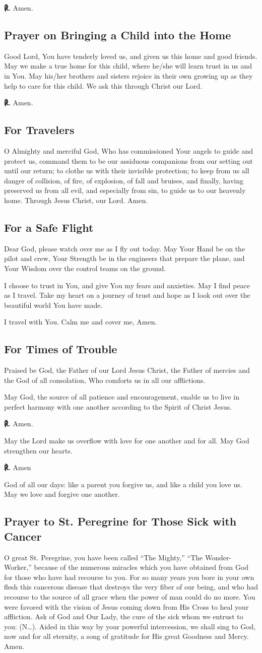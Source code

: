 \documentclass[12pt]{article}
\makeatletter
\newcommand{\prayertitle}[1]{\subsection{#1}}
\newcommand{\insertname}{(N\dots)\xspace}
\newcommand{\response}{{\setmainfont{Times New Roman}\textbf{℟.}}\xspace}
\DeclareRobustCommand{\response}{\textbf{\vers@resp{0pt}{R}.}\xspace}
\newcommand{\vers@resp@sym}{\raisebox{0.2ex}{\rotatebox[origin=c]{-20}{$\m@th\rceil$}}}
\newcommand{\vers@resp}[2]{%
		{\ooalign{\hidewidth\kern#1\vers@resp@sym\hidewidth\cr#2\cr}}%
	}
\makeatother
\begin{document}
\response Amen.

\prayertitle{Prayer on Bringing a Child into the Home}
\label{prayer:bringing_child_into_home}
Good Lord, You have tenderly loved us, and given us this home and good friends.
May we make a true home for this child, where he/she will learn trust in us and in You.
May his/her brothers and sisters rejoice in their own growing up as they help to care for this child.
We ask this through Christ our Lord.

\response Amen.

\prayertitle{For Travelers}
\label{prayer:travelers}
O Almighty and merciful God, Who has commissioned Your angels to guide and protect us, command them to be our assiduous companions from our setting out until our return;
to clothe us with their invisible protection;
to keep from us all danger of collision, of fire, of explosion, of fall and bruises, and finally, having preserved us from all evil, and especially from sin, to guide us to our heavenly home.
Through Jesus Christ, our Lord. Amen.

\prayertitle{For a Safe Flight}
Dear God, please watch over me as I fly out today.
May Your Hand be on the pilot and crew, Your Strength be in the engineers that prepare the plane, and Your Wisdom over the control teams on the ground.

I choose to trust in You, and give You my fears and anxieties.
May I find peace as I travel.
Take my heart on a journey of trust and hope as I look out over the beautiful world You have made.

I travel with You.
Calm me and cover me,
Amen.

\prayertitle{For Times of Trouble}
\label{prayer:times_of_trouble}
Praised be God, the Father of our Lord Jesus Christ, the Father of mercies and the God of all consolation, Who comforts us in all our afflictions.

May God, the source of all patience and encouragement, enable us to live in perfect harmony with one another according to the Spirit of Christ Jesus.

\response Amen.

May the Lord make us overflow with love for one another and for all.
May God strengthen our hearts.

\response Amen

God of all our days: like a parent you forgive us, and like a child you love us.
May we love and forgive one another.

\prayertitle{Prayer to St. Peregrine for Those Sick with Cancer}
O great St. Peregrine, you have been called ``The Mighty,'' ``The Wonder-Worker,'' because of the numerous miracles which you have obtained from God for those who have had recourse to you.
For so many years you bore in your own flesh this cancerous disease that destroys the very fiber of our being, and who had recourse to the source of all grace when the power of man could do no more.
You were favored with the vision of Jesus coming down from His Cross to heal your affliction.
Ask of God and Our Lady, the cure of the sick whom we entrust to you: \insertname.
Aided in this way by your powerful intercession, we shall sing to God, now and for all eternity, a song of gratitude for His great Goodness and Mercy.
Amen.
\end{document}
